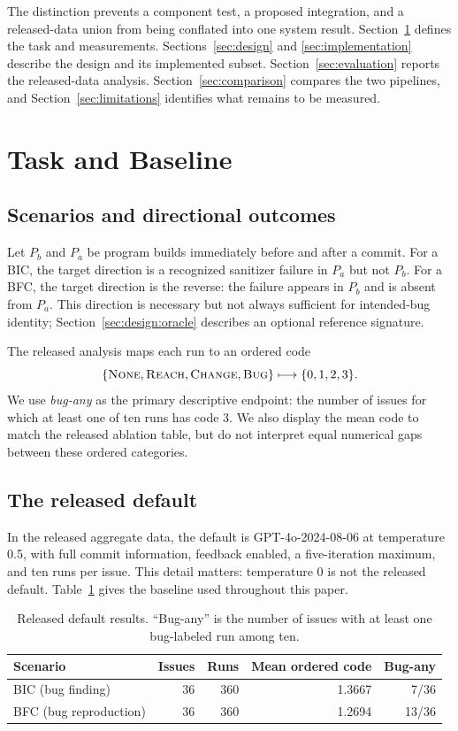 \documentclass{article}
\begin{document}
The distinction prevents a component test, a proposed integration, and a
released-data union from being conflated into one system result.  Section~\ref{sec:baseline} defines the task and measurements.  Sections~\ref{sec:design} and \ref{sec:implementation} describe the design and its
implemented subset.  Section~\ref{sec:evaluation} reports the released-data
analysis.  Section~\ref{sec:comparison} compares the two pipelines, and
Section~\ref{sec:limitations} identifies what remains to be measured.

\section{Task and Baseline}
\label{sec:baseline}

\subsection{Scenarios and directional outcomes}

Let $P_b$ and $P_a$ be program builds immediately before and after a commit.
For a BIC, the target direction is a recognized sanitizer failure in $P_a$ but
not $P_b$.  For a BFC, the target direction is the reverse: the failure appears
in $P_b$ and is absent from $P_a$.  This direction is necessary but not always
sufficient for intended-bug identity; Section~\ref{sec:design:oracle}
describes an optional reference signature.

The released analysis maps each run to an ordered code
\[
  \{\textsc{None},\textsc{Reach},\textsc{Change},\textsc{Bug}\}
  \longmapsto \{0,1,2,3\}.
\]
We use \emph{bug-any} as the primary descriptive endpoint: the number of issues
for which at least one of ten runs has code 3.  We also display the mean code to
match the released ablation table, but do not interpret equal numerical gaps
between these ordered categories.

\subsection{The released default}

In the released aggregate data, the default is GPT-4o-2024-08-06 at temperature
0.5, with full commit information, feedback enabled, a five-iteration maximum,
and ten runs per issue.  This detail matters: temperature 0 is not the released
default.  Table~\ref{tab:default} gives the baseline used throughout this paper.

\begin{table}[H]
\centering
\caption{Released default results.  ``Bug-any'' is the number of issues with at
least one bug-labeled run among ten.}
\label{tab:default}
\small
\begin{tabular}{lrrrr}
\toprule
Scenario & Issues & Runs & Mean ordered code & Bug-any \\
\midrule
BIC (bug finding) & 36 & 360 & 1.3667 & 7/36 \\
BFC (bug reproduction) & 36 & 360 & 1.2694 & 13/36 \\
\bottomrule
\end{tabular}
\end{table}
\end{document}

